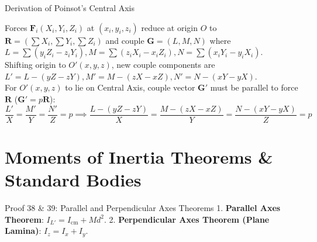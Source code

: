 \documentclass[11pt, a4paper]{report}
\begin{document}
\begin{proofbox}{Derivation of Poinsot's Central Axis}
\begin{center}
\end{center}

Forces $\mathbf{F}_i(X_i, Y_i, Z_i)$ at $(x_i, y_i, z_i)$ reduce at origin $O$ to $\mathbf{R} = (\sum X_i, \sum Y_i, \sum Z_i)$ and couple $\mathbf{G} = (L, M, N)$ where $L = \sum(y_i Z_i - z_i Y_i), M = \sum(z_i X_i - x_i Z_i), N = \sum(x_i Y_i - y_i X_i)$.\\
Shifting origin to $O'(x, y, z)$, new couple components are $L' = L - (yZ - zY), M' = M - (zX - xZ), N' = N - (xY - yX)$.\\
For $O'(x,y,z)$ to lie on Central Axis, couple vector $\mathbf{G}'$ must be parallel to force $\mathbf{R}$ ($\mathbf{G}' = p \mathbf{R}$):
\[
\frac{L'}{X} = \frac{M'}{Y} = \frac{N'}{Z} = p \implies \frac{L - (yZ - zY)}{X} = \frac{M - (zX - xZ)}{Y} = \frac{N - (xY - yX)}{Z} = p
\]
\end{proofbox}

\section{Moments of Inertia Theorems \& Standard Bodies}

\begin{theorembox}{Proof 38 \& 39: Parallel and Perpendicular Axes Theorems}
1. \textbf{Parallel Axes Theorem}: $I_{L'} = I_{\text{cm}} + M d^2$.
2. \textbf{Perpendicular Axes Theorem (Plane Lamina)}: $I_z = I_x + I_y$.
\end{theorembox}
\end{document}
